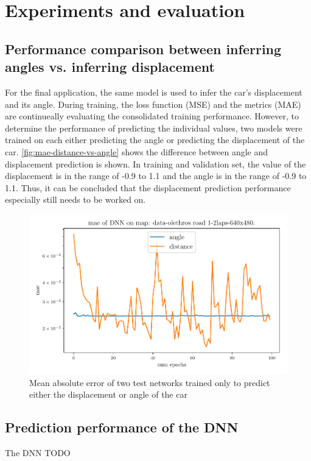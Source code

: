 \documentclass[10pt,a4paper,twoside,journal]{IEEEtran}
\begin{document}
\section{Experiments and evaluation}
\label{sc:evaluation}

\subsection{Performance comparison between inferring angles vs. inferring displacement}
For the final application, the same model is used to infer the car's displacement and its angle. During training, the loss function (MSE) and the metrics (MAE) are continueally evaluating the consolidated training performance. However, to determine the performance of predicting the individual values, two models were trained on each either predicting the angle or predicting the displacement of the car. \autoref{fig:mae-distance-vs-angle} shows the difference between angle and displacement prediction is shown. In training and validation set, the value of the displacement is in the range of -0.9 to 1.1 and the angle is in the range of -0.9 to 1.1. Thus, it can be concluded that the displacement prediction performance especially still needs to be worked on. 

\begin{figure}[ht]
	\centering
	\includegraphics[width=\columnwidth]{attachments/alexnet-val_mae-angle_dist_comp-05425-86589.pdf}
	\caption{Mean absolute error of two test networks trained only to predict either the displacement or angle of the car}
	\label{fig:mae-distance-vs-angle}
\end{figure}

\subsection{Prediction performance of the DNN}
The DNN TODO
\end{document}
